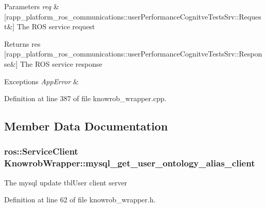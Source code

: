 \begin{DoxyParams}{Parameters}
{\em req} & \mbox{[}rapp\-\_\-platform\-\_\-ros\-\_\-communications\-::user\-Performance\-Cognitve\-Tests\-Srv\-::\-Request\&\mbox{]} The R\-O\-S service request \\
\hline
\end{DoxyParams}
\begin{DoxyReturn}{Returns}
res \mbox{[}rapp\-\_\-platform\-\_\-ros\-\_\-communications\-::user\-Performance\-Cognitve\-Tests\-Srv\-::\-Response\&\mbox{]} The R\-O\-S service response 
\end{DoxyReturn}

\begin{DoxyExceptions}{Exceptions}
{\em App\-Error} & \\
\hline
\end{DoxyExceptions}


Definition at line 387 of file knowrob\-\_\-wrapper.\-cpp.



\subsection{Member Data Documentation}
\hypertarget{classKnowrobWrapper_a39f2268a17653590d51a7b3e0e243c6c}{
\subsubsection[{mysql\-\_\-get\-\_\-user\-\_\-ontology\-\_\-alias\-\_\-client}]{\setlength{\rightskip}{0pt plus 5cm}ros\-::\-Service\-Client Knowrob\-Wrapper\-::mysql\-\_\-get\-\_\-user\-\_\-ontology\-\_\-alias\-\_\-client\hspace{0.3cm}{\ttfamily [private]}}}\label{classKnowrobWrapper_a39f2268a17653590d51a7b3e0e243c6c}
The mysql update tbl\-User client server 

Definition at line 62 of file knowrob\-\_\-wrapper.\-h.

